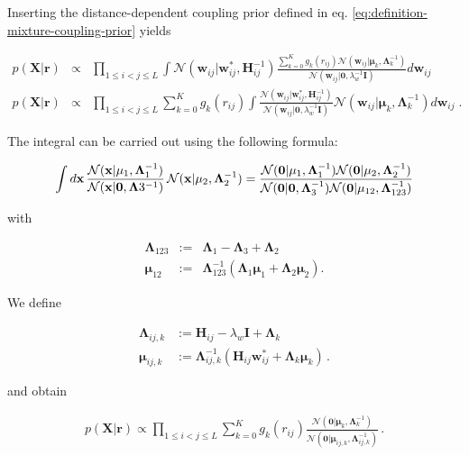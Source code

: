 \documentclass[12pt,a4paper,twoside]{book}
\newcommand{\Gauss}{\mathcal{N}}
\renewcommand{\H}{\mathbf{H}}
\newcommand{\I}{\mathbf{I}}
\newcommand{\Lijk}{\mathbf{\Lambda}_{ij,k}}
\newcommand{\Lk}{\mathbf{\Lambda}_k}
\newcommand{\muijk}{\mathbf{\mu}_{ij,k}}
\newcommand{\muk}{\mathbf{\mu}_k}
\renewcommand{\r}{\mathbf{r}}
\newcommand{\rij}{r_{ij}}
\newcommand{\seq}{\mathbf{x}}
\newcommand{\wij}{\mathbf{w}_{ij}}
\newcommand{\X}{\mathbf{X}}
\theoremstyle{definition}
\theoremstyle{definition}
\theoremstyle{remark}
\begin{document}
Inserting the distance-dependent coupling prior defined in eq.
\eqref{eq:definition-mixture-coupling-prior} yields

\begin{eqnarray}
   p(\X | \r) &\propto& \prod_{1\le i<j\le L} \int \Gauss (\wij | \wij^*, \H_{ij}^{-1}) \frac{\sum_{k=0}^K g_{k}(\rij) \Gauss(\wij | \muk, \Lk^{-1})}{\Gauss (\wij | \mathbf{0}, \lambda_w^{-1} \I)} d \wij \\
   p(\X | \r) &\propto& \prod_{1\le i<j\le L} \sum_{k=0}^K g_{k}(\rij) \int \frac{\Gauss (\wij | \wij^*, \H_{ij}^{-1})}{\Gauss (\wij | \mathbf{0}, \lambda_w^{-1} \I)} \Gauss(\wij | \muk, \Lk^{-1}) d\wij \; .
\label{eq:int-over-w-3}
\end{eqnarray}

The integral can be carried out using the following formula:

\begin{equation}
    \int d\seq \, \frac{ \Gauss( \seq | \mathbf{\mu}_1, \mathbf{\Lambda}_1^{-1}) }{\Gauss(\seq|\mathbf{0},\mathbf{\Lambda}3^{-1})} \, \Gauss(\seq|\mathbf{\mu}_2,\mathbf{\Lambda}_2^{-1}) = \\
    \frac{\Gauss(\mathbf{0}| \mathbf{\mu}_1, \mathbf{\Lambda}_{1}^{-1}) \Gauss(\mathbf{0}| \mathbf{\mu}_2, \mathbf{\Lambda}_{2}^{-1})}{\Gauss(\mathbf{0}|\mathbf{0}, \mathbf{\Lambda}_{3}^{-1}) \Gauss(\mathbf{0}| \mathbf{\mu}_{12}, \mathbf{\Lambda}_{123}^{-1})} 
\end{equation}

with

\begin{eqnarray}
    \mathbf{\Lambda}_{123} &:=& \mathbf{\Lambda}_1 - \mathbf{\Lambda}_3 + \mathbf{\Lambda}_2 \\
    \mathbf{\mu}_{12}  &:=& \mathbf{\Lambda}_{123}^{-1}(\mathbf{\Lambda}_1 \mathbf{\mu}_1 + \mathbf{\Lambda}_2 \mathbf{\mu}_2).
\end{eqnarray}

We define

\begin{align}
    \Lijk   &:= \H_{ij} - \lambda_w \I + \Lk \\ 
    \muijk  &:= \Lijk^{-1}(\H_{ij} \wij^* + \Lk \muk) \,.
\label{eq:def-Jkij}
\end{align}

and obtain

\begin{align}
p(\X | \r) \propto \prod_{1 \le i < j \le L}  \sum_{k=0}^K g_{k}(\rij) \frac{\Gauss( \mathbf{0} | \muk, \Lk^{-1})}{\Gauss(\mathbf{0} | \muijk, \Lijk^{-1})}  \,.
\label{eq:pXr-final}
\end{align}
\end{document}
